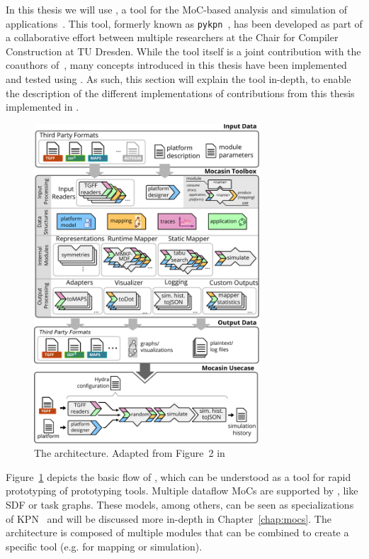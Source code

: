 In this thesis we will use \mocasin, a tool for the \ac{MoC}-based analysis and simulation of applications~\cite{menard_rapido21}.
This tool, formerly known as \texttt{pykpn}~\cite{menard_norcas16,goens_mcsoc18}, has been developed as part of a collaborative effort between multiple researchers at the Chair for Compiler Construction at TU Dresden.
While the tool itself is a joint contribution with the coauthors of~\cite{menard_rapido21}, many concepts introduced in this thesis have been implemented and tested using \mocasin.
As such, this section will explain the tool in-depth, to enable the description of the different implementations of contributions from this thesis implemented in \mocasin.

\begin{figure}[h]
	\centering
   \includegraphics[width=0.75\textwidth]{figures/mocasin.pdf}
	\caption{The \mocasin architecture. Adapted from Figure~2 in \cite{menard_rapido21}}
	\label{fig:mocasin_arch}
\end{figure}


Figure~\ref{fig:mocasin_arch} depicts the basic flow of \mocasin,
which can be understood as a tool for rapid prototyping of prototyping tools.
Multiple dataflow \acp{MoC} are supported by \mocasin, like \ac{SDF} or task graphs.
These models, among others, can be seen as specializations of \ac{KPN}~\cite{lee1995dataflow} and will be discussed more in-depth in Chapter~\ref{chap:mocs}.
The \mocasin architecture is composed of multiple modules that can be combined to create a specific tool (e.g. for mapping or simulation). 


